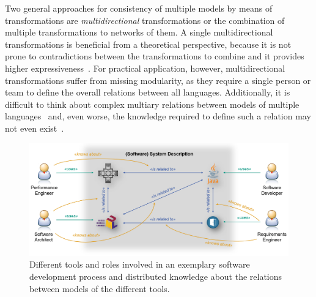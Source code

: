 Two general approaches for consistency of multiple %
models by means of transformations are \emph{multidirectional} transformations or the combination of multiple transformations to networks of them.
A single multidirectional transformations is beneficial from a theoretical perspective, because it is not prone to contradictions between the transformations to combine and it provides higher expressiveness~\cite{stevens2020BidirectionalTransformationLarge-SoSym}.
For practical application, however, multidirectional transformations suffer from missing modularity, as they require a single person or team to define the overall relations between all languages.
Additionally, it is difficult to think about complex multiary relations between models of multiple languages~\cite{stevens2020BidirectionalTransformationLarge-SoSym} and, even worse, the knowledge required to define such a relation may not even exist~.

\begin{figure}
    \centering
    \includegraphics[width=\textwidth]{figures/prologue/introduction/distributed_knowledge.png}
    \caption[Tools and distributed knowledge in engineering processes]{Different tools and roles involved in an exemplary software development process and distributed knowledge about the relations between models of the different tools.}
    \label{fig:introduction:distributed_knowledge}
\end{figure}

